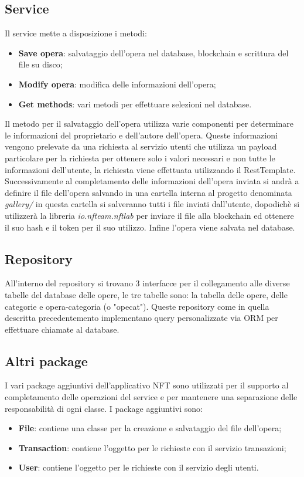 \subsection{Service}
Il service mette a disposizione i metodi:
\begin{itemize}
	\item \textbf{Save opera}: salvataggio dell'opera nel database, blockchain e scrittura del file su disco;
	\item \textbf{Modify opera}: modifica delle informazioni dell'opera;
	\item \textbf{Get methods}: vari metodi per effettuare selezioni nel database.
\end{itemize}
Il metodo per il salvataggio dell'opera utilizza varie componenti per determinare le informazioni del proprietario e dell'autore dell'opera. Queste informazioni vengono prelevate da una richiesta al servizio utenti che utilizza un payload particolare per la richiesta per ottenere solo i valori necessari e non tutte le informazioni dell'utente, la richiesta viene effettuata utilizzando il RestTemplate. Successivamente al completamento delle informazioni dell'opera inviata si andrà a definire il file dell'opera salvando in una cartella interna al progetto denominata \emph{gallery/} in questa cartella si salveranno tutti i file inviati dall'utente, dopodichè si utilizzerà la libreria \emph{io.nfteam.nftlab} per inviare il file alla blockchain ed ottenere il suo hash e il token per il suo utilizzo. Infine l'opera viene salvata nel database.
\subsection{Repository}
All'interno del repository si trovano 3 interfacce per il collegamento alle diverse tabelle del database delle opere, le tre tabelle sono: la tabella delle opere, delle categorie e opera-categoria (o "opecat"). Queste repository come in quella descritta precedentemento implementano query personalizzate via ORM per effettuare chiamate al database.
\subsection{Altri package}
I vari package aggiuntivi dell'applicativo NFT sono utilizzati per il supporto al completamento delle operazioni del service e per mantenere una separazione delle responsabilità di ogni classe. I package aggiuntivi sono:
\begin{itemize}
	\item \textbf{File}: contiene una classe per la creazione e salvataggio del file dell'opera;
	\item \textbf{Transaction}: contiene l'oggetto per le richieste con il servizio transazioni;
	\item \textbf{User}: contiene l'oggetto per le richieste con il servizio degli utenti.
\end{itemize}
